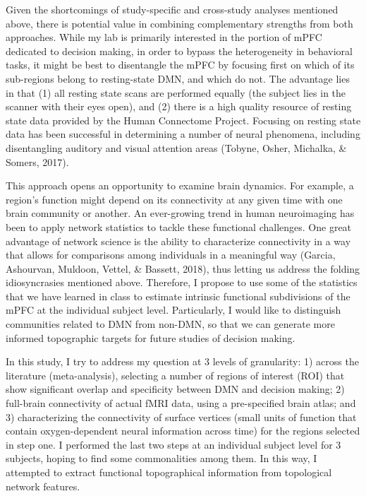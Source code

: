 \documentclass[9pt,twocolumn,twoside,]{pnas-new}
\begin{document}
Given the shortcomings of study-specific and cross-study analyses
mentioned above, there is potential value in combining complementary
strengths from both approaches. While my lab is primarily interested in
the portion of mPFC dedicated to decision making, in order to bypass the
heterogeneity in behavioral tasks, it might be best to disentangle the
mPFC by focusing first on which of its sub-regions belong to
resting-state DMN, and which do not. The advantage lies in that (1) all
resting state scans are performed equally (the subject lies in the
scanner with their eyes open), and (2) there is a high quality resource
of resting state data provided by the Human Connectome Project. Focusing
on resting state data has been successful in determining a number of
neural phenomena, including disentangling auditory and visual attention
areas (Tobyne, Osher, Michalka, \& Somers, 2017).

This approach opens an opportunity to examine brain dynamics. For
example, a region's function might depend on its connectivity at any
given time with one brain community or another. An ever-growing trend in
human neuroimaging has been to apply network statistics to tackle these
functional challenges. One great advantage of network science is the
ability to characterize connectivity in a way that allows for
comparisons among individuals in a meaningful way (Garcia, Ashourvan,
Muldoon, Vettel, \& Bassett, 2018), thus letting us address the folding
idiosyncrasies mentioned above. Therefore, I propose to use some of the
statistics that we have learned in class to estimate intrinsic
functional subdivisions of the mPFC at the individual subject level.
Particularly, I would like to distinguish communities related to DMN
from non-DMN, so that we can generate more informed topographic targets
for future studies of decision making.

In this study, I try to address my question at 3 levels of granularity:
1) across the literature (meta-analysis), selecting a number of regions
of interest (ROI) that show significant overlap and specificity between
DMN and decision making; 2) full-brain connectivity of actual fMRI data,
using a pre-specified brain atlas; and 3) characterizing the
connectivity of surface vertices (small units of function that contain
oxygen-dependent neural information across time) for the regions
selected in step one. I performed the last two steps at an individual
subject level for 3 subjects, hoping to find some commonalities among
them. In this way, I attempted to extract functional topographical
information from topological network features.
\end{document}
